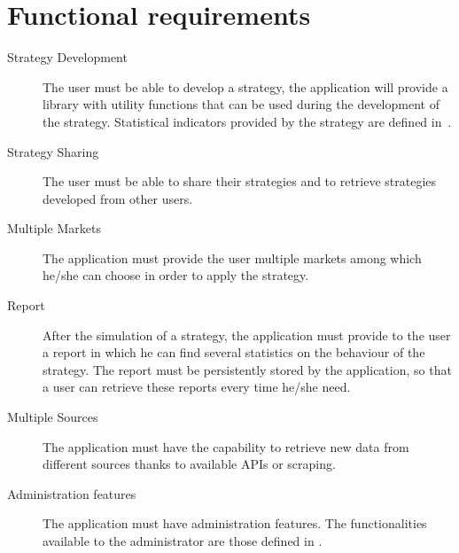 \section{Functional requirements}\label{sec:functionalrequirements}

\begin{description}
	\item[Strategy Development] The user must be able to develop a strategy,
		the application will provide a library with utility functions
		that can be used during the development of the strategy.
		Statistical indicators provided by the strategy are defined
		in~.
	\item[Strategy Sharing] The user must be able to share their strategies
		and to retrieve strategies developed from other users.
	\item[Multiple Markets] The application must provide the user multiple
		markets among which he/she can choose in order to apply the
		strategy.
	\item[Report] After the simulation of a strategy, the application must
		provide to the user a report in which he can find several
		statistics on the behaviour of the strategy. The report must be
		persistently stored by the application, so that a user can
		retrieve these reports every time he/she need.
	\item[Multiple Sources] The application must have the capability to
		retrieve new data from different sources thanks to available
		APIs or scraping.
	\item[Administration features] The application must have
		administration features. The functionalities available to the
		administrator are those defined in .
\end{description}
